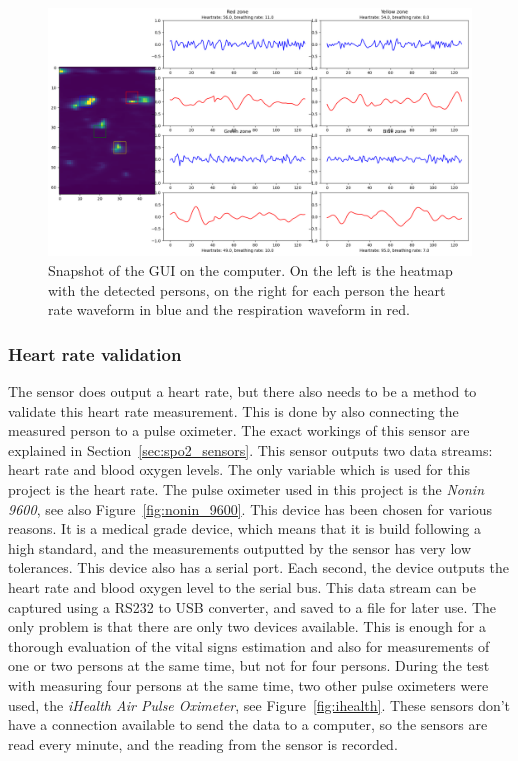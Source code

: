 \begin{figure}[ht]
    \centering
    \includegraphics[width=.95\textwidth]{figures/validation/4personen_testen_crop2.png}
    \caption{Snapshot of the GUI on the computer. On the left is the heatmap with the detected persons, on the right for each person the heart rate waveform in blue and the respiration waveform in red.}
    \label{fig:gui_computer}
\end{figure}

\subsubsection{Heart rate validation}
\label{sec:heartrate_validation}
The sensor does output a heart rate, but there also needs to be a method to validate this heart rate measurement. This is done by also connecting the measured person to a pulse oximeter. The exact workings of this sensor are explained in Section~\ref{sec:spo2_sensors}. This sensor outputs two data streams: heart rate and blood oxygen levels. The only variable which is used for this project is the heart rate. The pulse oximeter used in this project is the \emph{Nonin 9600}, see also Figure~\ref{fig:nonin_9600}. This device has been chosen for various reasons. It is a medical grade device, which means that it is build following a high standard, and the measurements outputted by the sensor has very low tolerances. This device also has a serial port. Each second, the device outputs the heart rate and blood oxygen level to the serial bus. This data stream can be captured using a RS232 to USB converter, and saved to a file for later use. The only problem is that there are only two devices available. This is enough for a thorough evaluation of the vital signs estimation and also for measurements of one or two persons at the same time, but not for four persons. During the test with measuring four persons at the same time, two other pulse oximeters were used, the \emph{iHealth Air Pulse Oximeter}, see Figure~\ref{fig:ihealth}. These sensors don't have a connection available to send the data to a computer, so the sensors are read every minute, and the reading from the sensor is recorded. 

